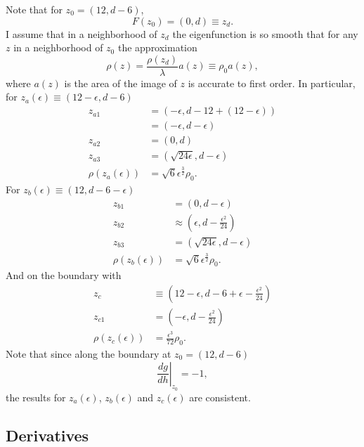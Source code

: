 \documentclass[twocolumn]{article}
\begin{document}
Note that for $z_0 = (12,d-6)$,
\begin{equation*}
  F(z_0) = (0,d) \equiv z_d.
\end{equation*}
I assume that in a neighborhood of $z_d$ the eigenfunction is so
smooth that for any $z$ in a neighborhood of $z_0$ the approximation
\begin{equation*}
  \rho(z) = \frac{\rho(z_d)}{\lambda} a(z) \equiv \rho_0  a(z),
\end{equation*}
where $a(z)$ is the area of the image of $z$ is accurate to first
order.  In particular, for $z_a(\epsilon) \equiv (12-\epsilon, d-6)$
\begin{align*}
  z_{a1} &= (-\epsilon, d - 12 + (12-\epsilon)) \\
  &= (-\epsilon, d - \epsilon) \\
  z_{a2} &= (0,d) \\
  z_{a3} &= (\sqrt{24 \epsilon}, d - \epsilon) \\
  \rho(z_a(\epsilon)) &= \sqrt{6} \epsilon^{\frac{3}{2}}\rho_0.
\end{align*}
For $z_b(\epsilon) \equiv (12, d-6-\epsilon)$
\begin{align*}
  z_{b1} &= (0,d-\epsilon) \\
  z_{b2} &\approx (\epsilon ,d - \frac{\epsilon^2}{24}) \\
  z_{b3} &= (\sqrt{24 \epsilon}, d - \epsilon) \\
  \rho(z_b(\epsilon)) &= \sqrt{6} \epsilon^{\frac{3}{2}}\rho_0.
\end{align*}
And on the boundary with
\begin{align*}
  z_c & \equiv \left(12 - \epsilon , d - 6 + \epsilon -
  \frac{\epsilon^2}{24} \right) \\
  z_{c1} &= \left( -\epsilon, d - \frac{\epsilon^2}{24} \right) \\
  \rho(z_c(\epsilon)) & = \frac{\epsilon^3}{72} \rho_0.
\end{align*}
Note that since along the boundary at $z_0 = (12, d-6)$
\begin{equation*}
  \left. \frac{dg}{dh} \right|_{z_0} = -1,
\end{equation*}
the results for $z_a(\epsilon)$, $z_b(\epsilon)$ and $z_c(\epsilon)$
are consistent.

\subsection{Derivatives}
\label{sec:derivatives}
\end{document}
